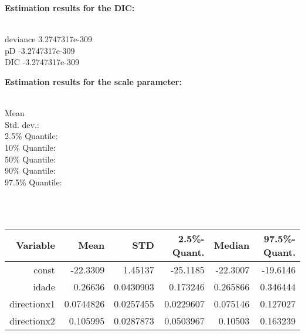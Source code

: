 \documentclass[a4paper, 12pt]{article}
\begin{document}
 {\bf \large Estimation results for the DIC: }\\ 

\begin{tabbing}
\hspace{3cm} \= \\
deviance \> 3.2747317e-309 \\
pD  \> -3.2747317e-309 \\
DIC  \> -3.2747317e-309 \\
\end{tabbing}


 {\bf \large Estimation results for the scale parameter: }\\ 

\vspace{-0.4cm}
\begin{tabbing}
\hspace{3cm} \= \\
Mean   \\
Std. dev.:   \\
  2.5\% Quantile:   \\
  10\% Quantile:   \\
  50\% Quantile:   \\
  90\% Quantile:   \\
  97.5\% Quantile:   \\
\end{tabbing}


\newpage 


\\
\\
\begin{tabular}{|r|rrrrr|}
\hline
Variable & Mean & STD & 2.5\%-Quant. & Median & 97.5\%-Quant.\\
\hline
const & -22.3309 & 1.45137 & -25.1185 & -22.3007 & -19.6146\\
idade & 0.26636 & 0.0430903 & 0.173246 & 0.265866 & 0.346444\\
directionx1 & 0.0744826 & 0.0257455 & 0.0229607 & 0.075146 & 0.127027\\
directionx2 & 0.105995 & 0.0287873 & 0.0503967 & 0.10503 & 0.163239\\
\hline 
\end{tabular}
\end{document}
